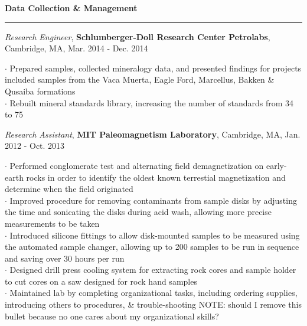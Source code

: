 \documentclass[11pt]{article}
\begin{document}
\vspace*{0.25 mm}
\textbf{Data Collection \& Management}
\smallskip
\hrule
\emph{Research Engineer}, \textbf {Schlumberger-Doll Research Center Petrolabs}, Cambridge, MA, Mar. 2014 - Dec. 2014 \\ 
\begin{small}$\cdot$ {Prepared samples, collected mineralogy data, and presented findings for projects included samples from the Vaca Muerta, Eagle Ford, Marcellus, Bakken \& Qusaiba  formations}\\
$\cdot$ {Rebuilt mineral standards library, increasing the number of standards from 34 to 75}\end{small} 

\smallskip
\emph {Research Assistant}, \textbf {MIT Paleomagnetism Laboratory}, Cambridge, MA, Jan. 2012 - Oct. 2013 \\ 
\begin{small}$\cdot$ {Performed conglomerate test and alternating field demagnetization on early-earth rocks in order to identify the oldest known terrestial magnetization and determine when the field originated} \\
$\cdot$ {Improved procedure for removing contaminants from sample disks by adjusting the time and sonicating the disks during acid wash, allowing more precise measurements to be taken} \\
$\cdot$ {Introduced silicone fittings to allow disk-mounted samples to be measured using the automated sample changer, allowing up to 200 samples to be run in sequence and saving over 30 hours per run} \\
$\cdot$ {Designed drill press cooling system for extracting rock cores and sample holder to cut cores on a saw designed for rock hand samples} \\
$\cdot$ {Maintained lab by completing organizational tasks, including ordering supplies, introducing others to procedures, \& trouble-shooting NOTE: should I remove this bullet because no one cares about my organizational skills?}\end{small}
\end{document}
